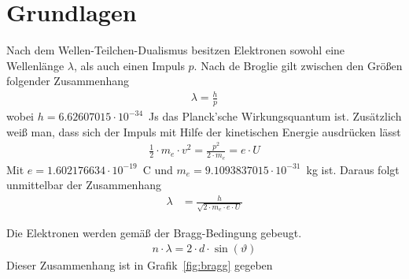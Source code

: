 \documentclass{article}
\begin{document}
\section{Grundlagen}

Nach dem Wellen-Teilchen-Dualismus besitzen Elektronen sowohl eine Wellenlänge $\lambda$, als auch einen Impuls $p$. Nach de Broglie gilt zwischen den Größen folgender Zusammenhang
\begin{align}
\lambda = \frac{h}{p}
\label{eq:debroglie}
\end{align}
wobei $h=6.62607015\cdot 10^{-34}$~Js das Planck'sche Wirkungsquantum ist. Zusätzlich weiß man, dass sich der Impuls mit Hilfe der kinetischen Energie ausdrücken lässt
\begin{align*}
\frac{1}{2}\cdot m_e \cdot v^2 = \frac{p^2}{2\cdot m_e} = e\cdot U
\end{align*}
Mit $e=1.602176634\cdot 10^{-19}$~C und $m_e=9.1093837015\cdot 10^{-31}$~kg ist. Daraus folgt unmittelbar der Zusammenhang
\begin{align}
\lambda  &= \frac{h}{\sqrt{2\cdot m_e \cdot e\cdot U}} 
\label{eq:lambda}
\end{align}



Die Elektronen werden gemäß der Bragg-Bedingung gebeugt.
\begin{align*}
n\cdot\lambda = 2\cdot d\cdot\sin(\vartheta)
\end{align*}
Dieser Zusammenhang ist in Grafik~\ref{fig:bragg} gegeben
\end{document}
